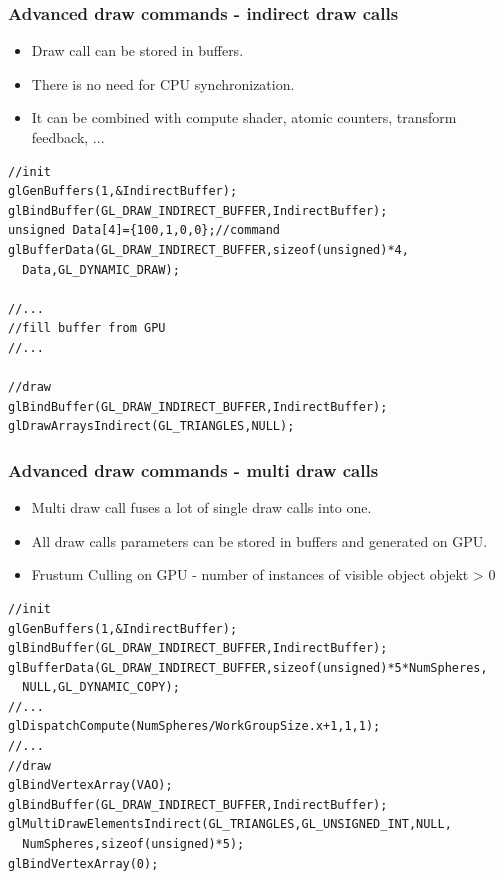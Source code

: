 \begin{frame}[fragile]
\frametitle{Advanced draw commands - indirect draw calls}
	\begin{itemize}
  \item Draw call can be stored in buffers.
  \item There is no need for CPU synchronization.
  \item It can be combined with compute shader, atomic counters, transform feedback, ...
	\end{itemize}
{\scriptsize
\begin{verbatim}
//init
glGenBuffers(1,&IndirectBuffer);
glBindBuffer(GL_DRAW_INDIRECT_BUFFER,IndirectBuffer);
unsigned Data[4]={100,1,0,0};//command
glBufferData(GL_DRAW_INDIRECT_BUFFER,sizeof(unsigned)*4,
  Data,GL_DYNAMIC_DRAW);

//...
//fill buffer from GPU
//...

//draw
glBindBuffer(GL_DRAW_INDIRECT_BUFFER,IndirectBuffer);
glDrawArraysIndirect(GL_TRIANGLES,NULL);
\end{verbatim}
}
\end{frame}

\begin{frame}[fragile]
\frametitle{Advanced draw commands - multi draw calls}
	\begin{itemize}
    \item Multi draw call fuses a lot of single draw calls into one.
    \item All draw calls parameters can be stored in buffers and generated on GPU.
    \item Frustum Culling on GPU - number of instances of visible object objekt > 0
	\end{itemize}
{\scriptsize
\begin{verbatim}
//init
glGenBuffers(1,&IndirectBuffer);
glBindBuffer(GL_DRAW_INDIRECT_BUFFER,IndirectBuffer);
glBufferData(GL_DRAW_INDIRECT_BUFFER,sizeof(unsigned)*5*NumSpheres,
  NULL,GL_DYNAMIC_COPY);
//...
glDispatchCompute(NumSpheres/WorkGroupSize.x+1,1,1);
//...
//draw
glBindVertexArray(VAO);
glBindBuffer(GL_DRAW_INDIRECT_BUFFER,IndirectBuffer);
glMultiDrawElementsIndirect(GL_TRIANGLES,GL_UNSIGNED_INT,NULL,
  NumSpheres,sizeof(unsigned)*5);
glBindVertexArray(0);
\end{verbatim}
}
\end{frame}

